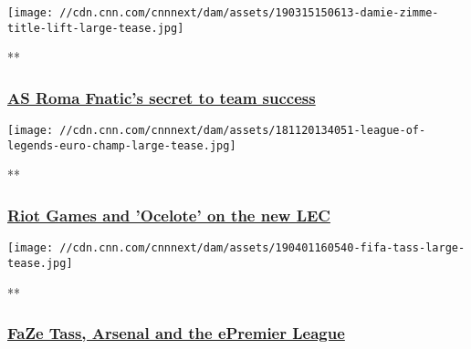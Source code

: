 \href{/videos/sports/2019/03/13/fnatic-as-roma-fifa-gaming-house-esports-london-football-spt-intl-gbr.cnn}{}

\texttt{[image: //cdn.cnn.com/cnnnext/dam/assets/190315150613-damie-zimme-title-lift-large-tease.jpg]}

**

\hypertarget{as-roma-fnatics-secret-to-team-success}{%
\subsubsection{\texorpdfstring{\href{/videos/sports/2019/03/13/fnatic-as-roma-fifa-gaming-house-esports-london-football-spt-intl-gbr.cnn}{AS
Roma Fnatic's secret to team
success}}{AS Roma Fnatic's secret to team success}}\label{as-roma-fnatics-secret-to-team-success}}

\href{/videos/sports/2018/11/21/league-of-legends-european-championship-exclusive-riot-games-g2-esports-spt-intl.cnn}{}

\texttt{[image: //cdn.cnn.com/cnnnext/dam/assets/181120134051-league-of-legends-euro-champ-large-tease.jpg]}

**

\hypertarget{riot-games-and-ocelote-on-the-new-lec}{%
\subsubsection{\texorpdfstring{\href{/videos/sports/2018/11/21/league-of-legends-european-championship-exclusive-riot-games-g2-esports-spt-intl.cnn}{Riot
Games and 'Ocelote' on the new
LEC}}{Riot Games and 'Ocelote' on the new LEC}}\label{riot-games-and-ocelote-on-the-new-lec}}

\href{/videos/sports/2019/04/03/tass-profile-epremier-league-arsenal-faze-fifa-player-esports-spt-intl-gbr.cnn}{}

\texttt{[image: //cdn.cnn.com/cnnnext/dam/assets/190401160540-fifa-tass-large-tease.jpg]}

**

\hypertarget{faze-tass-arsenal-and-the-epremier-league}{%
\subsubsection{\texorpdfstring{\href{/videos/sports/2019/04/03/tass-profile-epremier-league-arsenal-faze-fifa-player-esports-spt-intl-gbr.cnn}{FaZe
Tass, Arsenal and the ePremier
League}}{FaZe Tass, Arsenal and the ePremier League}}\label{faze-tass-arsenal-and-the-epremier-league}}

